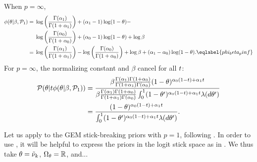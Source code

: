 \begin{ex}

When $p = \infty$,
%
\begin{align}
%
\phi(\theta \vert \beta, \palt) ={}&
    \log \left(
        \frac{\Gamma(\alpha_1) }{\Gamma(1 + \alpha_1)}
    \right)  + (\alpha_1 - 1) \log (1 - \theta) - \nonumber\\
{}&
    \log \left(
        \frac{\Gamma(\alpha_0)}{\Gamma(1 + \alpha_0)}
    \right) + (\alpha_0 - 1) \log (1 - \theta)  + \log \beta \nonumber\\
={}&
\log \left(
    \frac{\Gamma(\alpha_1) }{\Gamma(1 + \alpha_1)}
\right) -
\log \left(
    \frac{\Gamma(\alpha_0)}{\Gamma(1 + \alpha_0)}
\right) + \log \beta + (\alpha_1 - \alpha_0) \log(1 - \theta).
\eqlabel{phi_beta_pinf}
%
\end{align}
%
For $p = \infty$, the normalizing constant and $\beta$ cancel for all $t$:
%
\begin{align*}
%
\p(\theta \vert \t \phi(\theta \vert \beta, \palt)) ={}&
\frac{  \beta \frac{\Gamma(\alpha_1) \Gamma(1 + \alpha_0) }
                   {\Gamma(1 + \alpha_1) \Gamma(\alpha_0)}
        (1-\theta)^{\alpha_0 (1 - \t) + \alpha_1 \t}
    }
    {
        \beta \frac{\Gamma(\alpha_1) \Gamma(1 + \alpha_0) }
                   {\Gamma(1 + \alpha_1) \Gamma(\alpha_0)}
             \int_0^1 (1-\theta')^{\alpha_0 (1 - \t) +
                                   \alpha_1 \t} \lambda(d\theta')
     }
\\={}&
\frac{(1-\theta)^{\alpha_0 (1 - \t) + \alpha_1 \t}}
     {\int_0^1 (1-\theta')^{\alpha_0 (1 - \t) + \alpha_1 \t} \lambda(d\theta')}.
%
\end{align*}
%
\end{ex}


\begin{ex}
%
Let us apply  to the GEM stick-breaking priors with
$p=1$, following .  In order  to use
, it will be helpful to express the priors
in the logit stick space as in .  We thus take
$\theta = \tilde{\nu}_{k}$, $\Omega_{\theta} = \mathbb{R}$, and...
%
\end{ex}
